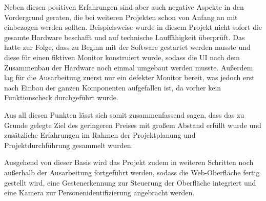 Neben diesen positiven Erfahrungen sind aber auch negative Aspekte in den Vordergrund geraten, die bei weiteren Projekten schon von Anfang an mit einbezogen werden sollten. Beispielsweise wurde in diesem Projekt nicht sofort die gesamte Hardware beschafft und auf technische Lauffähigkeit überprüft. Das hatte zur Folge, dass zu Beginn mit der Software gestartet werden musste und diese für einen fiktiven Monitor konstruiert wurde, sodass die UI nach dem Zusammenbau der Hardware noch einmal umgebaut werden musste. Außerdem lag für die Ausarbeitung zuerst nur ein defekter Monitor bereit, was jedoch erst nach Einbau der ganzen Komponenten aufgefallen ist, da vorher kein Funktionscheck durchgeführt wurde.

Aus all diesen Punkten lässt sich somit zusammenfassend sagen, dass das zu Grunde gelegte Ziel des geringeren Preises mit großem Abstand erfüllt wurde und zusätzliche Erfahrungen im Rahmen der Projektplanung und Projektdurchführung gesammelt wurden.

Ausgehend von dieser Basis wird das Projekt zudem in weiteren Schritten noch außerhalb der Ausarbeitung fortgeführt werden, sodass die Web-Oberfläche fertig gestellt wird, eine Gestenerkennung zur Steuerung der Oberfläche integriert und eine Kamera zur Personenidentifizierung angebracht werden.
